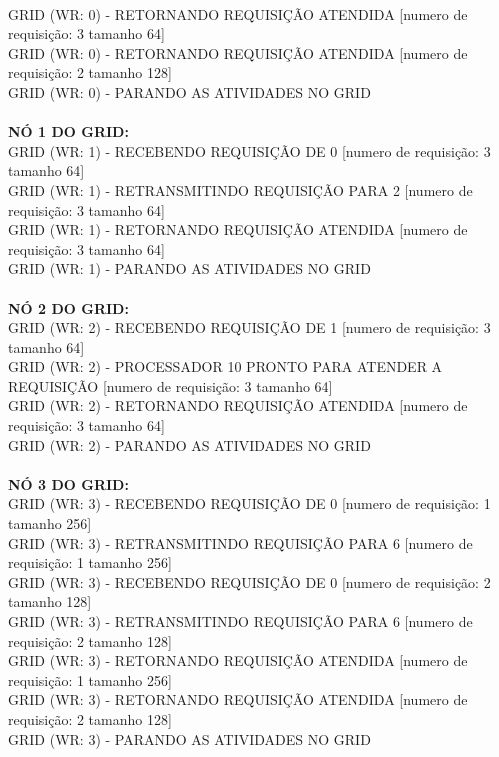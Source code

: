 \documentclass[12pt]{article}
\newcommand\tab[1][1cm]{\hspace*{#1}}
\begin{document}
\\
\tab \tab GRID (WR: 0) - RETORNANDO REQUISIÇÃO ATENDIDA [numero de requisição: 3 tamanho 64]
\\
\tab \tab GRID (WR: 0) - RETORNANDO REQUISIÇÃO ATENDIDA [numero de requisição: 2 tamanho 128]
\\
\tab \tab GRID (WR: 0) - PARANDO AS ATIVIDADES NO GRID
\\
\\
\tab \textbf{NÓ 1 DO GRID:}
\\
\tab \tab GRID (WR: 1) - RECEBENDO REQUISIÇÃO DE 0 [numero de requisição: 3 tamanho 64]
\\
\tab \tab GRID (WR: 1) - RETRANSMITINDO REQUISIÇÃO PARA 2 [numero de requisição: 3 tamanho 64]
\\
\tab \tab GRID (WR: 1) - RETORNANDO REQUISIÇÃO ATENDIDA [numero de requisição: 3 tamanho 64]
\\
\tab \tab GRID (WR: 1) - PARANDO AS ATIVIDADES NO GRID
\\
\\
\tab \textbf{NÓ 2 DO GRID:}
\\
\tab \tab GRID (WR: 2) - RECEBENDO REQUISIÇÃO DE 1 [numero de requisição: 3 tamanho 64]
\\
\tab \tab GRID (WR: 2) - PROCESSADOR 10 PRONTO PARA ATENDER A REQUISIÇÃO [numero de requisição: 3 tamanho 64]
\\
\tab \tab GRID (WR: 2) - RETORNANDO REQUISIÇÃO ATENDIDA [numero de requisição: 3 tamanho 64]
\\
\tab \tab GRID (WR: 2) - PARANDO AS ATIVIDADES NO GRID
\\
\\
\tab \textbf{NÓ 3 DO GRID:}
\\
\tab \tab GRID (WR: 3) - RECEBENDO REQUISIÇÃO DE 0 [numero de requisição: 1 tamanho 256]
\\
\tab \tab GRID (WR: 3) - RETRANSMITINDO REQUISIÇÃO PARA 6 [numero de requisição: 1 tamanho 256]
\\
\tab \tab GRID (WR: 3) - RECEBENDO REQUISIÇÃO DE 0 [numero de requisição: 2 tamanho 128]
\\
\tab \tab GRID (WR: 3) - RETRANSMITINDO REQUISIÇÃO PARA 6 [numero de requisição: 2 tamanho 128]
\\
\tab \tab GRID (WR: 3) - RETORNANDO REQUISIÇÃO ATENDIDA [numero de requisição: 1 tamanho 256]
\\
\tab \tab GRID (WR: 3) - RETORNANDO REQUISIÇÃO ATENDIDA [numero de requisição: 2 tamanho 128]
\\
\tab \tab GRID (WR: 3) - PARANDO AS ATIVIDADES NO GRID
\end{document}
